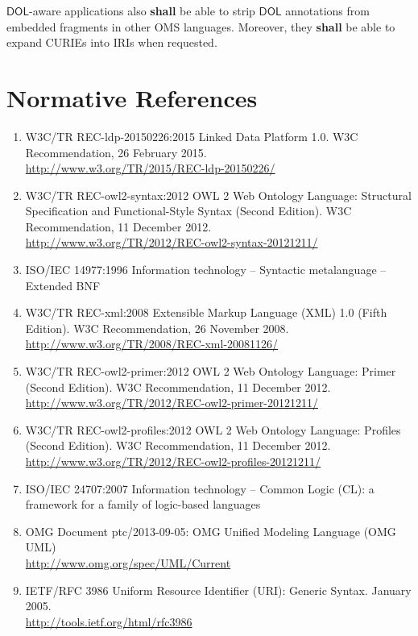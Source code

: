 \documentclass[10pt,fleqn,final]{scrreprt}
\newcommand*{\shall}{\textbf{shall}\xspace}
\newcommand*{\DOL}{\ensuremath{\mathsf{DOL}}\xspace}
\newcommand{\clause}[1]{\chapter{#1}}
\begin{document}
\DOL-aware applications also  \shall  be able to strip \DOL annotations
from embedded fragments in other OMS languages. Moreover, they  \shall 
be able to expand CURIEs into IRIs when requested.


\clause{Normative References}
\begin{enumerate}[label=\bfseries NR\arabic*:]
  \item{W3C/TR REC-ldp-20150226:2015} {Linked Data Platform 1.0. W3C Recommendation, 26 February 2015.\\ \url{http://www.w3.org/TR/2015/REC-ldp-20150226/}}
  \item{W3C/TR REC-owl2-syntax:2012} {OWL 2 Web Ontology Language: Structural Specification and Functional-Style Syntax (Second Edition). W3C Recommendation, 11 December 2012.\\ \url{http://www.w3.org/TR/2012/REC-owl2-syntax-20121211/}}
  \item{ISO/IEC 14977:1996} {Information technology – Syntactic metalanguage – Extended BNF}
  \item{W3C/TR REC-xml:2008} {Extensible Markup Language (XML) 1.0 (Fifth Edition). W3C Recommendation, 26 November 2008. \\
  \url{http://www.w3.org/TR/2008/REC-xml-20081126/}}
  \item{W3C/TR REC-owl2-primer:2012} {OWL 2 Web Ontology Language: Primer (Second Edition). W3C Recommendation, 11 December 2012. \\
  \url{http://www.w3.org/TR/2012/REC-owl2-primer-20121211/}}
  \item{W3C/TR REC-owl2-profiles:2012} {OWL 2 Web Ontology Language: Profiles (Second Edition). W3C Recommendation, 11 December 2012. \\
  \url{http://www.w3.org/TR/2012/REC-owl2-profiles-20121211/}}
  \item{ISO/IEC 24707:2007} {Information technology – Common Logic (CL): a framework for a family of logic-based languages}
  \item{OMG Document ptc/2013-09-05:} {OMG Unified Modeling Language (OMG UML)\\
  \url{http://www.omg.org/spec/UML/Current}}
  \item{IETF/RFC 3986} {Uniform Resource Identifier (URI): Generic Syntax. January 2005.\\ \url{http://tools.ietf.org/html/rfc3986}}

\end{enumerate}
\end{document}
